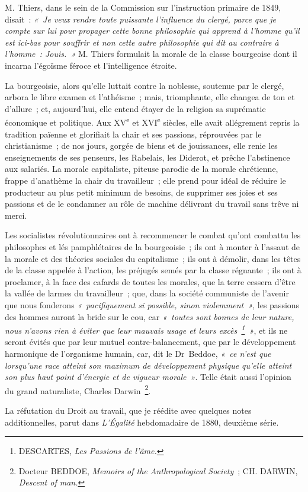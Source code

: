 \documentclass[french,twoside]{book} %
\newcommand\chaptercont{} %
\newcommand\chapterclose{} %
\begin{document}
\chaptercont
\noindent M. Thiers, dans le sein de la Commission sur l’instruction primaire de 1849, disait : \emph{« Je veux rendre toute puissante l’influence du clergé, parce que je compte sur lui pour propager cette bonne philosophie qui apprend à l’homme qu’il est ici-bas pour souffrir et non cette autre philosophie qui dit au contraire à l’homme : \emph{Jouis}. »} M. Thiers formulait la morale de la classe bourgeoise dont il incarna l’égoïsme féroce et l’intelligence étroite.\par
La bourgeoisie, alors qu’elle luttait contre la noblesse, soutenue par le clergé, arbora le libre examen et l’athéisme ; mais, triomphante, elle changea de ton et d’allure ; et, aujourd’hui, elle entend étayer de la religion sa suprématie économique et politique. Aux XV\textsuperscript{e} et XVI\textsuperscript{e} siècles, elle avait allégrement repris la tradition païenne et glorifiait la chair et ses passions, réprouvées par le christianisme ; de nos jours, gorgée de biens et de jouissances, elle renie les enseignements de ses penseurs, les Rabelais, les Diderot, et prêche l’abstinence aux salariés. La morale capitaliste, piteuse parodie de la morale chrétienne, frappe d’anathème la chair du travailleur ; elle prend pour idéal de réduire le producteur au plus petit minimum de besoins, de supprimer ses joies et ses passions et de le condamner au rôle de machine délivrant du travail sans trêve ni merci.\par
Les socialistes révolutionnaires ont à recommencer le combat qu’ont combattu les philosophes et lés pamphlétaires de la bourgeoisie ; ils ont à monter à l’assaut de la morale et des théories sociales du capitalisme ; ils ont à démolir, dans les têtes de la classe appelée à l’action, les préjugés semés par la classe régnante ; ils ont à proclamer, à la face des cafards de toutes les morales, que la terre cessera d’être la vallée de larmes du travailleur ; que, dans la société communiste de l’avenir que nous fonderons \emph{« pacifiquement si possible, sinon violemment »}, les passions des hommes auront la bride sur le cou, car \emph{« toutes sont bonnes de leur nature, nous n’avons rien à éviter que leur mauvais usage et leurs excès \footnote{DESCARTES,\emph{ Les Passions de l’âme.}} »}, et ils ne seront évités que par leur mutuel contre-balancement, que par le développement harmonique de l’organisme humain, car, dit le Dr Beddoe, \emph{« ce n’est que lorsqu’une race atteint son maximum de développement physique qu’elle atteint son plus haut point d’énergie et de vigueur morale »}. Telle était aussi l’opinion du grand naturaliste, Charles Darwin \footnote{Docteur BEDDOE, \emph{Memoirs of the Anthropological Society} ; CH. DARWIN, \emph{Descent of man.}}.\par
La réfutation du Droit au travail, que je réédite avec quelques notes additionnelles, parut dans \emph{L’Égalité} hebdomadaire de 1880, deuxième série.
\chapterclose
\end{document}
